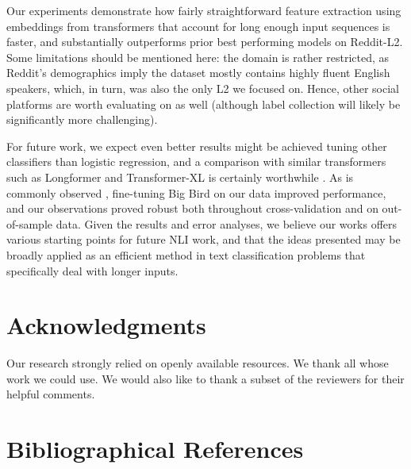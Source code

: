 \documentclass[10pt, a4paper]{article}
\begin{document}
Our experiments demonstrate how fairly straightforward feature extraction using embeddings from transformers that account for long enough input sequences is faster, and substantially outperforms prior best performing models on Reddit-L2. Some limitations should be mentioned here: the domain is rather restricted, as Reddit's demographics imply the dataset mostly contains highly fluent English speakers, which, in turn, was also the only L2 we focused on. Hence, other social platforms are worth evaluating on as well (although label collection will likely be significantly more challenging). 

For future work, we expect even better results might be achieved tuning other classifiers than  logistic regression, and a comparison with similar transformers such as Longformer \cite{DBLP:journals/corr/abs-2004-05150} and Transformer-XL \cite{DBLP:conf/acl/DaiYYCLS19} is certainly worthwhile \cite{DBLP:journals/corr/abs-2304-11062}. As is commonly observed \cite{DBLP:conf/naacl/DevlinCLT19,DBLP:conf/cncl/SunQXH19,DBLP:conf/acl/RuderH18}, fine-tuning Big Bird on our data improved performance, and our observations proved robust both throughout cross-validation and on out-of-sample data. Given the results and error analyses, we believe our works offers various starting points for future NLI work, and that the ideas presented may be broadly applied as an efficient method in text classification problems that specifically deal with longer inputs.


\section{Acknowledgments}

Our research strongly relied on openly available resources.  We thank all whose work we could use. We would also like to thank a subset of the reviewers for their helpful comments.

\nocite{*}
\section{Bibliographical References}\label{sec:reference}


\end{document}
